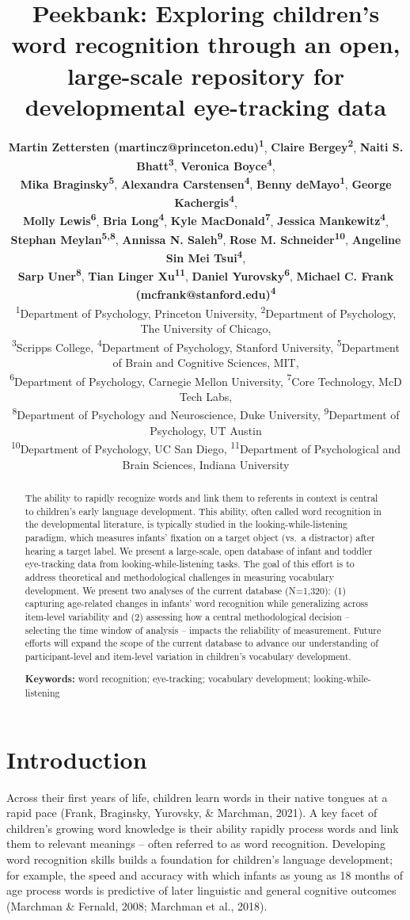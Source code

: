 \documentclass[10pt, letterpaper]{article}
\title{Peekbank: Exploring children's word recognition through an open,
large-scale repository for developmental eye-tracking data}
\author{{\large \bf Martin Zettersten (martincz@princeton.edu)\textsuperscript{1}}, {\large \bf Claire Bergey\textsuperscript{2}}, {\large \bf Naiti S. Bhatt\textsuperscript{3}}, {\large \bf Veronica Boyce\textsuperscript{4}},  \\ {\large \bf Mika Braginsky\textsuperscript{5}}, {\large \bf Alexandra Carstensen\textsuperscript{4}}, {\large \bf Benny deMayo\textsuperscript{1}}, {\large \bf George Kachergis\textsuperscript{4}},  \\ {\large \bf Molly Lewis\textsuperscript{6}}, {\large \bf Bria Long\textsuperscript{4}}, {\large \bf Kyle MacDonald\textsuperscript{7}}, {\large \bf Jessica Mankewitz\textsuperscript{4}},  \\ {\large \bf Stephan Meylan\textsuperscript{5,8}}, {\large \bf Annissa N. Saleh\textsuperscript{9}}, {\large \bf Rose M. Schneider\textsuperscript{10}}, {\large \bf Angeline Sin Mei Tsui\textsuperscript{4}},  \\ {\large \bf Sarp Uner\textsuperscript{8}}, {\large \bf Tian Linger Xu\textsuperscript{11}}, {\large \bf Daniel Yurovsky\textsuperscript{6}}, {\large \bf Michael C. Frank (mcfrank@stanford.edu)\textsuperscript{4}}  \\ {\textsuperscript{1}}Department of Psychology, Princeton University, {\textsuperscript{2}}Department of Psychology, The University of Chicago,  \\ {\textsuperscript{3}}Scripps College, {\textsuperscript{4}}Department of Psychology, Stanford University, {\textsuperscript{5}}Department of Brain and Cognitive Sciences, MIT,  \\ {\textsuperscript{6}}Department of Psychology, Carnegie Mellon University, {\textsuperscript{7}}Core Technology, McD Tech Labs,  \\ {\textsuperscript{8}}Department of Psychology and Neuroscience, Duke University, {\textsuperscript{9}}Department of Psychology, UT Austin \\ {\textsuperscript{10}}Department of Psychology, UC San Diego, {\textsuperscript{11}}Department of Psychological and Brain Sciences, Indiana University}
\begin{document}
\maketitle

\begin{abstract}
The ability to rapidly recognize words and link them to referents in
context is central to children's early language development. This
ability, often called word recognition in the developmental literature,
is typically studied in the looking-while-listening paradigm, which
measures infants' fixation on a target object (vs.~a distractor) after
hearing a target label. We present a large-scale, open database of
infant and toddler eye-tracking data from looking-while-listening tasks.
The goal of this effort is to address theoretical and methodological
challenges in measuring vocabulary development. We present two analyses
of the current database (N=1,320): (1) capturing age-related changes in
infants' word recognition while generalizing across item-level
variability and (2) assessing how a central methodological decision --
selecting the time window of analysis -- impacts the reliability of
measurement. Future efforts will expand the scope of the current
database to advance our understanding of participant-level and
item-level variation in children's vocabulary development.

\textbf{Keywords:}
word recognition; eye-tracking; vocabulary development;
looking-while-listening
\end{abstract}

\hypertarget{introduction}{%
\section{Introduction}\label{introduction}}

Across their first years of life, children learn words in their native
tongues at a rapid pace (Frank, Braginsky, Yurovsky, \& Marchman, 2021).
A key facet of children's growing word knowledge is their ability
rapidly process words and link them to relevant meanings -- often
referred to as word recognition. Developing word recognition skills
builds a foundation for children's language development; for example,
the speed and accuracy with which infants as young as 18 months of age
process words is predictive of later linguistic and general cognitive
outcomes (Marchman \& Fernald, 2008; Marchman et al., 2018).
\end{document}
